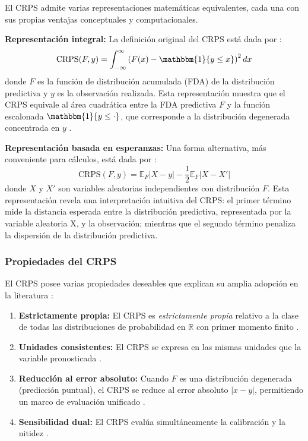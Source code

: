 El CRPS admite varias representaciones matemáticas equivalentes, cada una con sus propias ventajas conceptuales y computacionales.

\textbf{Representación integral:} La definición original del CRPS está dada por \parencite{GneitingRaftery2007}:
\begin{equation}
\text{CRPS}(F, y) = \int_{-\infty}^{\infty} \left(F(x) - \mathbbm{1}\{y \leq x\}\right)^2 dx
\label{eq:crps_integral}
\end{equation}
donde $F$ es la función de distribución acumulada (FDA) de la distribución predictiva y $y$ es la observación realizada. Esta representación muestra que el CRPS equivale al área cuadrática entre la FDA predictiva $F$ y la función escalonada $\mathbbm{1}\{y \leq \cdot\}$, que corresponde a la distribución degenerada concentrada en $y$ \parencite{Thorarinsdottir2017}.

\textbf{Representación basada en esperanzas:} Una forma alternativa, más conveniente para cálculos, está dada por \parencite{GneitingRaftery2007}:
\begin{equation}
\text{CRPS}(F, y) = \mathbb{E}_F|X - y| - \frac{1}{2}\mathbb{E}_F|X - X'|
\label{eq:crps_expectation}
\end{equation}
donde $X$ y $X'$ son variables aleatorias independientes con distribución $F$. Esta representación revela una interpretación intuitiva del CRPS: el primer término mide la distancia esperada entre la distribución predictiva, representada por la variable aleatoria X, y la observación; mientras que el segundo término penaliza la dispersión de la distribución predictiva.

\subsubsection{Propiedades del CRPS}

El CRPS posee varias propiedades deseables que explican su amplia adopción en la literatura \parencite{GneitingRaftery2007, Thorarinsdottir2017}:

\begin{enumerate}
\item \textbf{Estrictamente propia:} El CRPS es \textit{estrictamente propia} relativo a la clase de todas las distribuciones de probabilidad en $\mathbb{R}$ con primer momento finito \parencite{GneitingRaftery2007}.

\item \textbf{Unidades consistentes:} El CRPS se expresa en las mismas unidades que la variable pronosticada \parencite{Gneiting2014}.

\item \textbf{Reducción al error absoluto:} Cuando $F$ es una distribución degenerada (predicción puntual), el CRPS se reduce al error absoluto $|x-y|$, permitiendo un marco de evaluación unificado \parencite{GneitingRaftery2007}.

\item \textbf{Sensibilidad dual:} El CRPS evalúa simultáneamente la calibración y la nitidez \parencite{Thorarinsdottir2017}.
\end{enumerate}

